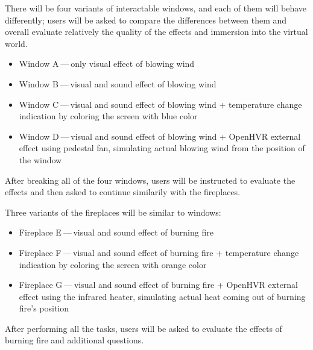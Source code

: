 There will be four variants of interactable windows, and each of them will
behave differently; users will be asked to compare the differences between
them and overall evaluate relatively the quality of the effects and
immersion into the virtual world.


\begin{itemize}
    \itemsep0em

\item Window A — only visual effect of blowing wind

\item Window B — visual and sound effect of blowing wind

\item Window C — visual and sound effect of blowing wind + temperature change
indication by coloring the screen with blue color

\item Window D — visual and sound effect of blowing wind + OpenHVR external effect
using pedestal fan, simulating actual blowing wind from the position of
the window

\end{itemize}


After breaking all of the four windows, users will be instructed to evaluate
the effects and then asked to continue similarily with the fireplaces.


Three variants of the fireplaces will be similar to windows:


\begin{itemize}
    \itemsep0em

\item Fireplace E — visual and sound effect of burning fire

\item Fireplace F — visual and sound effect of burning fire + temperature change
indication by coloring the screen with orange color

\item Fireplace G — visual and sound effect of burning fire + OpenHVR
external effect using the infrared heater, simulating actual heat coming
out of burning fire’s position

\end{itemize}


After performing all the tasks, users will be asked to evaluate the
effects of burning fire and additional questions.


